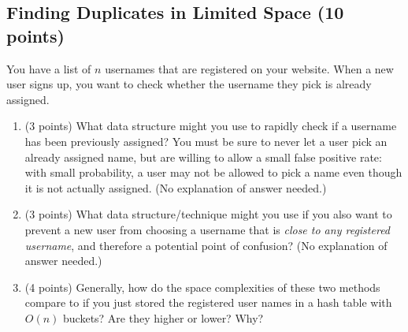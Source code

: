 \documentclass[11pt]{article}
\begin{document}
\subsection*{Finding Duplicates in Limited Space \normalfont (10 points)} 
You have a list of $n$ usernames that are registered on your website. When a new user signs up, you want to check whether the username they pick is already assigned.
\begin{enumerate}
\item (3 points) What data structure might you use to rapidly  check if a username has been previously assigned?
 You must be sure to never let a user pick an already  assigned name, but are willing to allow a small false positive rate: with small probability, a user may not be allowed to pick a name even though it is not actually assigned. (No explanation of answer needed.)
 \vspace{3em}
\item (3 points) What data structure/technique might you use if you also want to prevent a new user from choosing a username that is \emph{close to any registered username}, and therefore a potential point of confusion? (No explanation  of answer needed.)
\vspace{3em}
\item (4 points) Generally, how do the space complexities of these two methods compare to if you just stored the registered user names in a hash table with $O(n)$ buckets? Are they higher or lower? Why?
\vspace{10em}
\end{enumerate}
\end{document}
